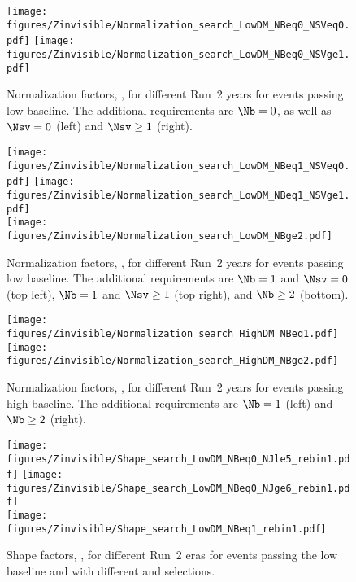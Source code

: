 \begin{figure}[tbp]
{
\centering
\texttt{[image: figures/Zinvisible/Normalization\_search\_LowDM\_NBeq0\_NSVeq0.pdf]}
\texttt{[image: figures/Zinvisible/Normalization\_search\_LowDM\_NBeq0\_NSVge1.pdf]}
\caption[Normalization factors, \Rz, for different Run~2 years for events passing low \dm baseline]
{
    Normalization factors, \Rz, for different Run~2 years for events passing low \dm baseline.
    The additional requirements are $\Nb = 0$, as well as $\Nsv = 0$ (left) and $\Nsv \geq 1$ (right).
}
\label{fig:norm_eras_lowdm_1}
}
\end{figure}

\begin{figure}[tbp]
{
\centering
\texttt{[image: figures/Zinvisible/Normalization\_search\_LowDM\_NBeq1\_NSVeq0.pdf]}
\texttt{[image: figures/Zinvisible/Normalization\_search\_LowDM\_NBeq1\_NSVge1.pdf]}\\
\texttt{[image: figures/Zinvisible/Normalization\_search\_LowDM\_NBge2.pdf]}
\caption[Normalization factors, \Rz, for different Run~2 years for events passing low \dm baseline]
{
    Normalization factors, \Rz, for different Run~2 years for events passing low \dm baseline.
    The additional requirements are $\Nb = 1$ and $\Nsv = 0$ (top left), $\Nb = 1$ and $\Nsv \geq 1$ (top right), and $\Nb \geq 2$ (bottom).
}
\label{fig:norm_eras_lowdm_2}
}
\end{figure}

\begin{figure}[tbp]
{
\centering
\texttt{[image: figures/Zinvisible/Normalization\_search\_HighDM\_NBeq1.pdf]}
\texttt{[image: figures/Zinvisible/Normalization\_search\_HighDM\_NBge2.pdf]}
\caption[Normalization factors, \Rz, for different Run~2 years for events passing high \dm baseline]
{
    Normalization factors, \Rz, for different Run~2 years for events passing high \dm baseline.
    The additional requirements are $\Nb = 1$ (left) and $\Nb \geq 2$ (right).
}
\label{fig:norm_eras_highdm}
}
\end{figure}

\begin{figure}[tbp]
{
\centering
\texttt{[image: figures/Zinvisible/Shape\_search\_LowDM\_NBeq0\_NJle5\_rebin1.pdf]}
\texttt{[image: figures/Zinvisible/Shape\_search\_LowDM\_NBeq0\_NJge6\_rebin1.pdf]}\\
\texttt{[image: figures/Zinvisible/Shape\_search\_LowDM\_NBeq1\_rebin1.pdf]}
\caption[Shape factors, \Sg, for different Run~2 eras for events passing the low \dm baseline and with different \Nb and \Nj selections]
{
    Shape factors, \Sg, for different Run~2 eras for events passing the low \dm baseline and with different \Nb and \Nj selections.
}
\label{fig:shape_eras_lowdm_1}
}
\end{figure}

